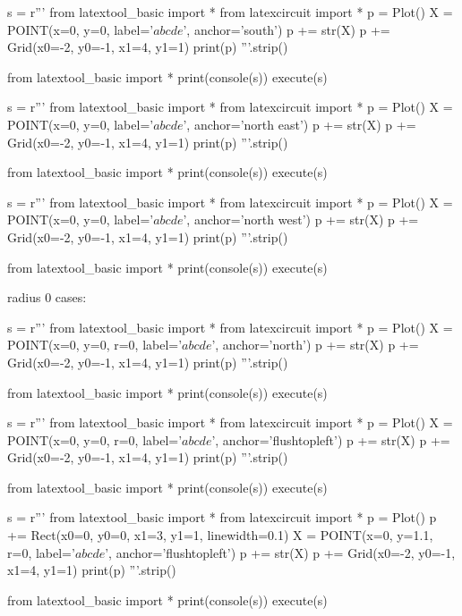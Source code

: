 \begin{python}
s = r'''
from latextool_basic import *
from latexcircuit import *
p = Plot()
X = POINT(x=0, y=0, label='$abcde$', anchor='south')
p += str(X)
p += Grid(x0=-2, y0=-1, x1=4, y1=1)
print(p)
'''.strip()

from latextool_basic import *
print(console(s))
execute(s)
\end{python}

\begin{python}
s = r'''
from latextool_basic import *
from latexcircuit import *
p = Plot()
X = POINT(x=0, y=0, label='$abcde$', anchor='north east')
p += str(X)
p += Grid(x0=-2, y0=-1, x1=4, y1=1)
print(p)
'''.strip()

from latextool_basic import *
print(console(s))
execute(s)
\end{python}

\begin{python}
s = r'''
from latextool_basic import *
from latexcircuit import *
p = Plot()
X = POINT(x=0, y=0, label='$abcde$', anchor='north west')
p += str(X)
p += Grid(x0=-2, y0=-1, x1=4, y1=1)
print(p)
'''.strip()

from latextool_basic import *
print(console(s))
execute(s)
\end{python}



\newpage
radius 0 cases:
\begin{python}
s = r'''
from latextool_basic import *
from latexcircuit import *
p = Plot()
X = POINT(x=0, y=0, r=0, label='$abcde$', anchor='north')
p += str(X)
p += Grid(x0=-2, y0=-1, x1=4, y1=1)
print(p)
'''.strip()

from latextool_basic import *
print(console(s))
execute(s)
\end{python}


\newpage
\begin{python}
s = r'''
from latextool_basic import *
from latexcircuit import *
p = Plot()
X = POINT(x=0, y=0, r=0, label='$abcde$', anchor='flushtopleft')
p += str(X)
p += Grid(x0=-2, y0=-1, x1=4, y1=1)
print(p)
'''.strip()

from latextool_basic import *
print(console(s))
execute(s)
\end{python}

\begin{python}
s = r'''
from latextool_basic import *
from latexcircuit import *
p = Plot()
p += Rect(x0=0, y0=0, x1=3, y1=1, linewidth=0.1)
X = POINT(x=0, y=1.1, r=0, label='$abcde$', anchor='flushtopleft')
p += str(X)
p += Grid(x0=-2, y0=-1, x1=4, y1=1)
print(p)
'''.strip()

from latextool_basic import *
print(console(s))
execute(s)
\end{python}



